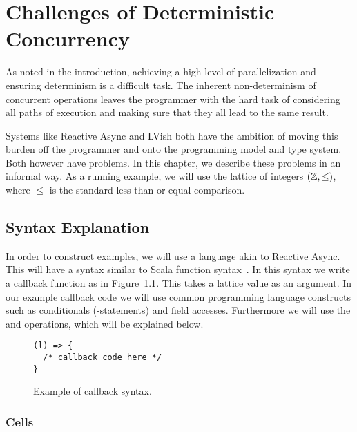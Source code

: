 \chapter{Challenges of Deterministic Concurrency}
\label{cha:challenges}

As noted in the introduction, achieving a high level of parallelization and
ensuring determinism is a difficult task. The inherent non-determinism of
concurrent operations leaves the programmer with the hard task of considering
all paths of execution and making sure that they all lead to the same result.

Systems like Reactive Async and LVish both have the ambition of moving this
burden off the programmer and onto the programming model and type system. Both
however have problems. In this chapter, we describe these problems in an informal
way. As a running example, we will use the lattice of integers $(\mathbb{Z},
\leq)$, where $\leq$ is the standard less-than-or-equal comparison.


\section{Syntax Explanation}%
\label{sec:operations}

In order to construct examples, we will use a language akin to Reactive Async.
This will have a syntax similar to Scala function
syntax~\parencite{scalabasics}. In this syntax we write a callback function as
in Figure~\ref{fig:callback_syntax}. This takes a lattice value  as an
argument. In our example callback code we will use common programming language
constructs such as conditionals (-statements) and field accesses.
Furthermore we will use the  and  operations, which will be
explained below.

\begin{figure}
  \centering
  \begin{minipage}{0.763\textwidth}
    \begin{lstlisting}[]
(l) => {
  /* callback code here */
}
    \end{lstlisting}
  \end{minipage}
  \caption{Example of callback syntax.}
  \label{fig:callback_syntax}
\end{figure}

\subsection{Cells}%
\label{sub:cells}

